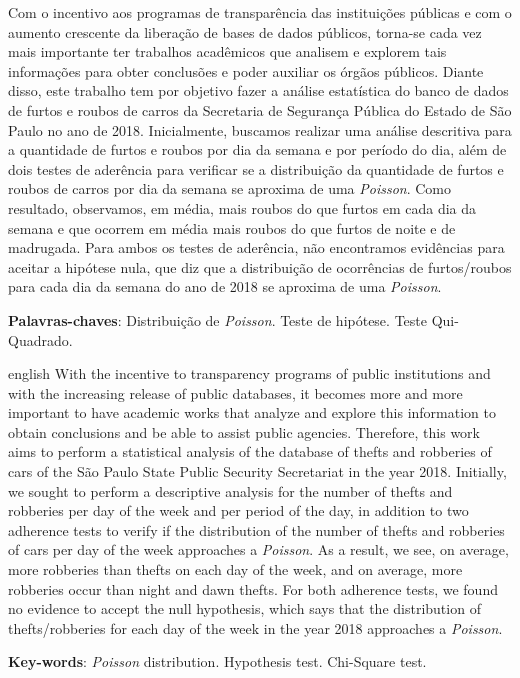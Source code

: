 \documentclass[
	12pt,
	openright,			%
	twoside,			%
	a4paper,			%
	chapter=TITLE,		%
	section=TITLE,		%
	subsection=TITLE,	%
	subsubsection=TITLE,%
	english,			%
	french,				%
	spanish,			%
	brazil				%
	]{abntex2}
\begin{document}
\setlength{\absparsep}{18pt} %
\begin{resumo}
Com o incentivo aos programas de transparência das instituições públicas e com o aumento crescente da liberação de bases de dados públicos, torna-se cada vez mais importante ter trabalhos acadêmicos que analisem e explorem tais informações para obter conclusões e poder auxiliar os órgãos públicos. Diante disso, este trabalho tem por objetivo fazer a análise estatística do banco de dados de furtos e roubos de carros da Secretaria de Segurança Pública do Estado de São Paulo no ano de 2018. Inicialmente, buscamos realizar uma análise descritiva para a quantidade de furtos e roubos por dia da semana e por período do dia, além de dois testes de aderência para verificar se a distribuição da quantidade de furtos e roubos de carros por dia da semana se aproxima de uma \textit{Poisson}.
Como resultado, observamos, em média, mais roubos do que furtos em cada dia da semana e que ocorrem em média mais roubos do que furtos de noite e de madrugada. Para ambos os testes de aderência, não encontramos evidências para aceitar a hipótese nula, que diz que a distribuição de ocorrências de furtos/roubos para cada dia da semana do ano de 2018 se aproxima de uma \textit{Poisson}.

   \vspace{\onelineskip}
 
   \noindent
    \textbf{Palavras-chaves}: Distribuição de \textit{Poisson}. Teste de hipótese. Teste Qui-Quadrado.
\end{resumo}

\begin{resumo}[Abstract]
 \begin{otherlanguage*}{english}
With the incentive to transparency programs of public institutions and with the increasing release of public databases, it becomes more and more important to have academic works that analyze and explore this information to obtain conclusions and be able to assist public agencies. Therefore, this work aims to perform a statistical analysis of the database of thefts and robberies of cars of the São Paulo State Public Security Secretariat in the year 2018. Initially, we sought to perform a descriptive analysis for the number of thefts and robberies per day of the week and per period of the day, in addition to two adherence tests to verify if the distribution of the number of thefts and robberies of cars per day of the week approaches a \textit{Poisson}.
As a result, we see, on average, more robberies than thefts on each day of the week, and on average, more robberies occur than night and dawn thefts. For both adherence tests, we found no evidence to accept the null hypothesis, which says that the distribution of thefts/robberies for each day of the week in the year 2018 approaches a \textit{Poisson}.

   \vspace{\onelineskip}
 
   \noindent
   \textbf{Key-words}: \textit{Poisson} distribution. Hypothesis test. Chi-Square test.
 \end{otherlanguage*}
\end{resumo}
\end{document}
